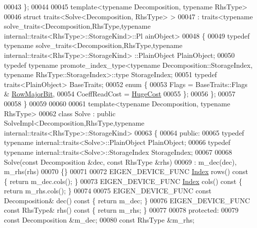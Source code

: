 \begin{DoxyCode}
00043 \};
00044 
00045 \textcolor{keyword}{template}<\textcolor{keyword}{typename} Decomposition, \textcolor{keyword}{typename} RhsType>
00046 \textcolor{keyword}{struct }traits<Solve<Decomposition, RhsType> >
00047   : traits<typename solve\_traits<Decomposition,RhsType,typename internal::traits<RhsType>::StorageKind>::Pl
      ainObject>
00048 \{
00049   \textcolor{keyword}{typedef} \textcolor{keyword}{typename} solve\_traits<Decomposition,RhsType,typename internal::traits<RhsType>::StorageKind>
      ::PlainObject PlainObject;
00050   \textcolor{keyword}{typedef} \textcolor{keyword}{typename} promote\_index\_type<typename Decomposition::StorageIndex, typename
       RhsType::StorageIndex>::type StorageIndex;
00051   \textcolor{keyword}{typedef} traits<PlainObject> BaseTraits;
00052   \textcolor{keyword}{enum} \{
00053     Flags = BaseTraits::Flags & \hyperlink{group__flags_gae4f56c2a60bbe4bd2e44c5b19cbe8762}{RowMajorBit},
00054     CoeffReadCost = \hyperlink{namespace_eigen_a3163430a1c13173faffde69016b48aaf}{HugeCost}
00055   \};
00056 \};
00057 
00058 \}
00059 
00060 
00061 \textcolor{keyword}{template}<\textcolor{keyword}{typename} Decomposition, \textcolor{keyword}{typename} RhsType>
00062 \textcolor{keyword}{class }Solve : \textcolor{keyword}{public} SolveImpl<Decomposition,RhsType,typename internal::traits<RhsType>::StorageKind>
00063 \{
00064 \textcolor{keyword}{public}:
00065   \textcolor{keyword}{typedef} \textcolor{keyword}{typename} internal::traits<Solve>::PlainObject PlainObject;
00066   \textcolor{keyword}{typedef} \textcolor{keyword}{typename} internal::traits<Solve>::StorageIndex StorageIndex;
00067   
00068   Solve(\textcolor{keyword}{const} Decomposition &dec, \textcolor{keyword}{const} RhsType &rhs)
00069     : m\_dec(dec), m\_rhs(rhs)
00070   \{\}
00071   
00072   EIGEN\_DEVICE\_FUNC \hyperlink{namespace_eigen_a62e77e0933482dafde8fe197d9a2cfde}{Index} rows()\textcolor{keyword}{ const }\{ \textcolor{keywordflow}{return} m\_dec.cols(); \}
00073   EIGEN\_DEVICE\_FUNC \hyperlink{namespace_eigen_a62e77e0933482dafde8fe197d9a2cfde}{Index} cols()\textcolor{keyword}{ const }\{ \textcolor{keywordflow}{return} m\_rhs.cols(); \}
00074 
00075   EIGEN\_DEVICE\_FUNC \textcolor{keyword}{const} Decomposition& dec()\textcolor{keyword}{ const }\{ \textcolor{keywordflow}{return} m\_dec; \}
00076   EIGEN\_DEVICE\_FUNC \textcolor{keyword}{const} RhsType&       rhs()\textcolor{keyword}{ const }\{ \textcolor{keywordflow}{return} m\_rhs; \}
00077 
00078 \textcolor{keyword}{protected}:
00079   \textcolor{keyword}{const} Decomposition &m\_dec;
00080   \textcolor{keyword}{const} RhsType       &m\_rhs;

\end{DoxyCode}
